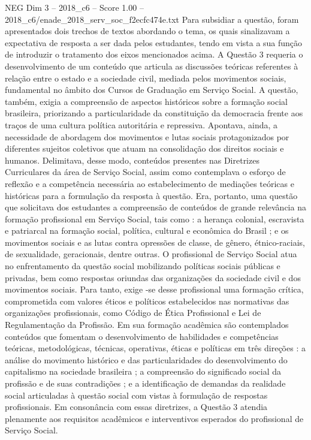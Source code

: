 \begin{textsample}{NEG Dim 3 – 2018\_c6 – Score 1.00 – 2018\_c6/enade\_2018\_serv\_soc\_f2ecfc474e.txt}
Para subsidiar a questão, foram apresentados dois trechos de textos abordando o tema, os quais sinalizavam a expectativa de resposta a ser dada pelos estudantes, tendo em vista a sua função de introduzir o tratamento dos eixos mencionados acima.
A Questão 3 requeria o desenvolvimento de um conteúdo que articula as discussões teóricas referentes à relação entre o estado e a sociedade civil, mediada pelos movimentos sociais, fundamental no âmbito dos Cursos de Graduação em Serviço Social.
A questão, também, exigia a compreensão de aspectos históricos sobre a formação social brasileira, priorizando a particularidade da constituição da democracia frente aos traços de uma cultura política autoritária e repressiva.
Apontava, ainda, a necessidade de abordagem dos movimentos e lutas sociais protagonizados por diferentes sujeitos coletivos que atuam na consolidação dos direitos sociais e humanos.
Delimitava, desse modo, conteúdos presentes nas Diretrizes Curriculares da área de Serviço Social, assim como contemplava o esforço de reflexão e a competência necessária ao estabelecimento de mediações teóricas e históricas para a formulação da resposta à questão.
Era, portanto, uma questão que solicitava dos estudantes a compreensão de conteúdos de grande relevância na formação profissional em Serviço Social, tais como : a herança colonial, escravista e patriarcal na formação social, política, cultural e econômica do Brasil ; e os movimentos sociais e as lutas contra opressões de classe, de gênero, étnico-raciais, de sexualidade, geracionais, dentre outras.
O profissional de Serviço Social atua no enfrentamento da questão social mobilizando políticas sociais públicas e privadas, bem como respostas oriundas das organizações da sociedade civil e dos movimentos sociais.
Para tanto, exige -se desse profissional uma formação crítica, comprometida com valores éticos e políticos estabelecidos nas normativas das organizações profissionais, como Código de Ética Profissional e Lei de Regulamentação da Profissão.
Em sua formação acadêmica são contemplados conteúdos que fomentam o desenvolvimento de habilidades e competências teóricas, metodológicas, técnicas, operativas, éticas e políticas em três direções : a análise do movimento histórico e das particularidades do desenvolvimento do capitalismo na sociedade brasileira ; a compreensão do significado social da profissão e de suas contradições ; e a identificação de demandas da realidade social articuladas à questão social com vistas à formulação de respostas profissionais.
Em consonância com essas diretrizes, a Questão 3 atendia plenamente aos requisitos acadêmicos e interventivos esperados do profissional de Serviço Social.

\end{textsample}
